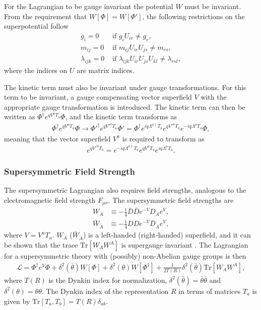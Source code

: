 \documentclass[twoside,english]{uiofysmaster}
\begin{document}
For the Lagrangian to be gauge invariant the potential $W$ must be invariant. From the requirement that $W[\Phi] = W[\Phi']$, the following restrictions on the superpotential follow
\begin{align}
g_i = 0 &\text{ if } g_i U_{ir} \neq g_r,\\
m_{ij} = 0 &\text{ if } m_{ij} U_{ir} U_{js} \neq m_{rs},\\
\lambda_{ijk} = 0 &\text{ if } \lambda_{ijk}U_{ir}U_{js}U_{kt} \neq \lambda_{rst},
\end{align} 
where the indices on $U$ are matrix indices. 

The kinetic term must also be invariant under gauge transformations. For this term to be invariant, a gauge compensating vector superfield $V$ with the appropriate gauge transformation is introduced. The kinetic term can then be written as $\Phi^{\dagger} e^{qV^aT_a} \Phi$, and the kinetic term transforms as
\begin{align}
\Phi^{\dagger} e^{qV^aT_a} \Phi \rightarrow {\Phi'}^{\dagger} e^{q{V'}^aT_a} \Phi' = \Phi^{\dagger} e^{iq\Lambda^{a \dagger} T_a} e^{q{V'}^aT_a} e^{-iq \Lambda^a T_a} \Phi,
\end{align}
meaning that the vector superfield $V^a$ is required to transform as
\begin{align}
e^{q{V'}^a T_a} = e^{-iq \Lambda^{a \dagger} T_a} e^{qV^aT_a} e^{iq\Lambda^a T_a}.
\end{align}

\subsubsection{Supersymmetric Field Strength}

The supersymmetric Lagrangian also requires field strengths, analogous to the electromagnetic field strength $F_{\mu \nu}$. The supersymmetric field strengths are 
\begin{align}
W_A & \equiv - \frac{1}{4} \bar{D} \bar{D} e^{-V} D_A e^V,\\
\bar{W}_{\dot{A}} & \equiv - \frac{1}{4} DDe^{-V}\bar{D}_{\dot{A}} e^V,
\end{align}
where $V = V^a T_a$. $W_A$ ($\bar{W}_{\dot{A}}$) is a left-handed (right-handed) superfield, and it can be shown that the trace $\text{Tr}[W_AW^A]$ is supergauge invariant \cite{batzing2017lecture}. The Lagrangian for a supersymmetric theory with (possibly) non-Abelian gauge groups is then
\begin{align}
\mathcal{L} = \Phi^{\dagger} e^{V} \Phi + \delta^2 (\bar{\theta}) W[\Phi] + \delta^2 (\theta) W[\Phi^{\dagger}] + \frac{1}{2T(R)} \delta^2 (\bar{\theta}) \text{Tr}[W_AW^A],
\end{align}
where $T(R)$ is the Dynkin index for normalization, $\delta^2(\bar{\theta}) = \bar{\theta} \bar{\theta}$ and $\delta^2(\theta) = \theta \theta$. The Dynkin index of the representation $R$ in terms of matrices $T_a$ is given by $\text{Tr}[T_a, T_b] = T(R) \delta_{ab}$.
\end{document}
